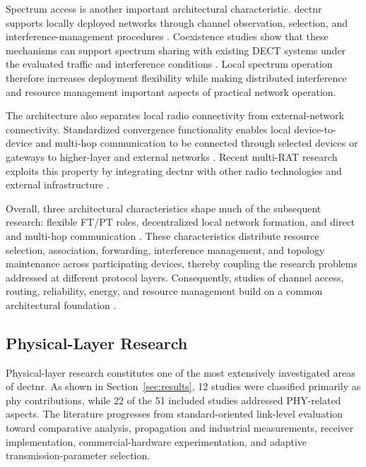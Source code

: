 Spectrum access is another important architectural characteristic. \gls{dectnr} supports locally deployed networks through channel observation, selection, and interference-management procedures \cite{etsi_ts103636_2,etsi_ts103636_3,etsi_ts103636_4}. Coexistence studies show that these mechanisms can support spectrum sharing with existing DECT systems under the evaluated traffic and interference conditions \cite{samuylovPerformanceAssessmentDECT20202023}. Local spectrum operation therefore increases deployment flexibility while making distributed interference and resource management important aspects of practical network operation.

The architecture also separates local radio connectivity from external-network connectivity. Standardized convergence functionality enables local device-to-device and multi-hop communication to be connected through selected devices or gateways to higher-layer and external networks \cite{etsi_ts103636_5}. Recent multi-RAT research exploits this property by integrating \gls{dectnr} with other radio technologies and external infrastructure \cite{dangUniRATUnifiedDECT20202026}.

Overall, three architectural characteristics shape much of the subsequent research: flexible FT/PT roles, decentralized local network formation, and direct and multi-hop communication \cite{kovalchukovDECT2020NewRadio2022, perez-guiraoDECTNRUnveiling2022, ahmadMACProtocolReducing2024, fuhrlingRobustRoutingProtocol2025b}. These characteristics distribute resource selection, association, forwarding, interference management, and topology maintenance across participating devices, thereby coupling the research problems addressed at different protocol layers. Consequently, studies of channel access, routing, reliability, energy, and resource management build on a common architectural foundation \cite{samuylovPerformanceMACLayer2024a, fuhrlingRobustRoutingProtocol2025b, samuylovEmpoweringNearURLLCIoT2025, bandaraExperimentalValidationAnalysis2025, grafParetoOptimalityApproach2026a}. 

\subsection{Physical-Layer Research}
\label{subsec:phy}

Physical-layer research constitutes one of the most extensively investigated areas of \gls{dectnr}. As shown in Section~\ref{sec:results}, 12 studies were classified primarily as \gls{phy} contributions, while 22 of the 51 included studies addressed PHY-related aspects. The literature progresses from standard-oriented link-level evaluation toward comparative analysis, propagation and industrial measurements, receiver implementation, commercial-hardware experimentation, and adaptive transmission-parameter selection.

